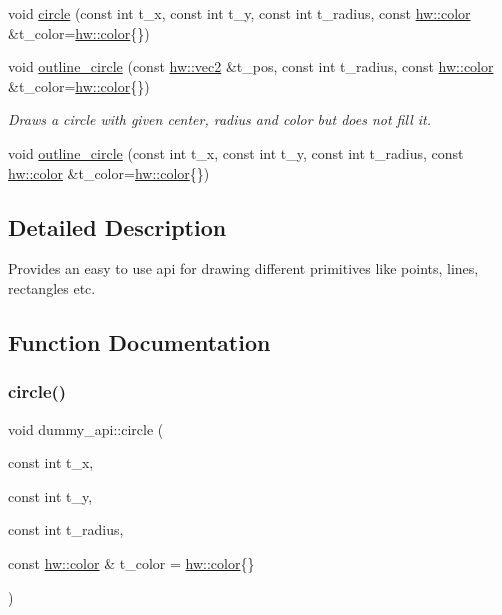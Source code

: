 \begin{DoxyCompactItemize}
void \mbox{\hyperlink{namespacedummy__api_a873ff67ce171c9920cb3d174444bc948}{circle}} (const int t\+\_\+x, const int t\+\_\+y, const int t\+\_\+radius, const \mbox{\hyperlink{structhw_1_1color}{hw\+::color}} \&t\+\_\+color=\mbox{\hyperlink{structhw_1_1color}{hw\+::color}}\{\})
\item 
\mbox{\label{namespacedummy__api_a35b3f34c20c038a11f609faa339046e4}} 
void \mbox{\hyperlink{namespacedummy__api_a35b3f34c20c038a11f609faa339046e4}{outline\+\_\+circle}} (const \mbox{\hyperlink{structhw_1_1vec2}{hw\+::vec2}} \&t\+\_\+pos, const int t\+\_\+radius, const \mbox{\hyperlink{structhw_1_1color}{hw\+::color}} \&t\+\_\+color=\mbox{\hyperlink{structhw_1_1color}{hw\+::color}}\{\})
\begin{DoxyCompactList}\small\item\em Draws a circle with given center, radius and color but does not fill it. \end{DoxyCompactList}\item 
void \mbox{\hyperlink{namespacedummy__api_a8969b153de5f674aa317eef53f47a980}{outline\+\_\+circle}} (const int t\+\_\+x, const int t\+\_\+y, const int t\+\_\+radius, const \mbox{\hyperlink{structhw_1_1color}{hw\+::color}} \&t\+\_\+color=\mbox{\hyperlink{structhw_1_1color}{hw\+::color}}\{\})
\end{DoxyCompactItemize}


\subsection{Detailed Description}
Provides an easy to use api for drawing different primitives like points, lines, rectangles etc. ~\newline
 

\subsection{Function Documentation}
\mbox{\label{namespacedummy__api_a873ff67ce171c9920cb3d174444bc948}} 
\subsubsection{\texorpdfstring{circle()}{circle()}}
{\footnotesize\ttfamily void dummy\+\_\+api\+::circle (\begin{DoxyParamCaption}\item[{const int}]{t\+\_\+x,  }\item[{const int}]{t\+\_\+y,  }\item[{const int}]{t\+\_\+radius,  }\item[{const \mbox{\hyperlink{structhw_1_1color}{hw\+::color}} \&}]{t\+\_\+color = {\ttfamily \mbox{\hyperlink{structhw_1_1color}{hw\+::color}}\{\}} }\end{DoxyParamCaption})}

